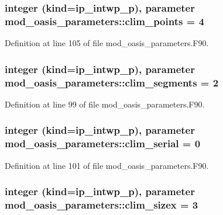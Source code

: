 \hypertarget{classmod__oasis__parameters_aa9d90a3d7d5b21d2081a578dfea42fd4}{
\subsubsection[{clim\+\_\+points}]{\setlength{\rightskip}{0pt plus 5cm}integer (kind=ip\+\_\+intwp\+\_\+p), parameter mod\+\_\+oasis\+\_\+parameters\+::clim\+\_\+points = 4}}\label{classmod__oasis__parameters_aa9d90a3d7d5b21d2081a578dfea42fd4}


Definition at line 105 of file mod\+\_\+oasis\+\_\+parameters.\+F90.

\hypertarget{classmod__oasis__parameters_a7427036a6530871a0f49c0fb75f2b3ef}{
\subsubsection[{clim\+\_\+segments}]{\setlength{\rightskip}{0pt plus 5cm}integer (kind=ip\+\_\+intwp\+\_\+p), parameter mod\+\_\+oasis\+\_\+parameters\+::clim\+\_\+segments = 2}}\label{classmod__oasis__parameters_a7427036a6530871a0f49c0fb75f2b3ef}


Definition at line 99 of file mod\+\_\+oasis\+\_\+parameters.\+F90.

\hypertarget{classmod__oasis__parameters_a5c410369e763f9156d0ce1c82e866265}{
\subsubsection[{clim\+\_\+serial}]{\setlength{\rightskip}{0pt plus 5cm}integer (kind=ip\+\_\+intwp\+\_\+p), parameter mod\+\_\+oasis\+\_\+parameters\+::clim\+\_\+serial = 0}}\label{classmod__oasis__parameters_a5c410369e763f9156d0ce1c82e866265}


Definition at line 101 of file mod\+\_\+oasis\+\_\+parameters.\+F90.

\hypertarget{classmod__oasis__parameters_a4fb35a666ab4cec927a2ae9244535cb0}{
\subsubsection[{clim\+\_\+sizex}]{\setlength{\rightskip}{0pt plus 5cm}integer (kind=ip\+\_\+intwp\+\_\+p), parameter mod\+\_\+oasis\+\_\+parameters\+::clim\+\_\+sizex = 3}}\label{classmod__oasis__parameters_a4fb35a666ab4cec927a2ae9244535cb0}


